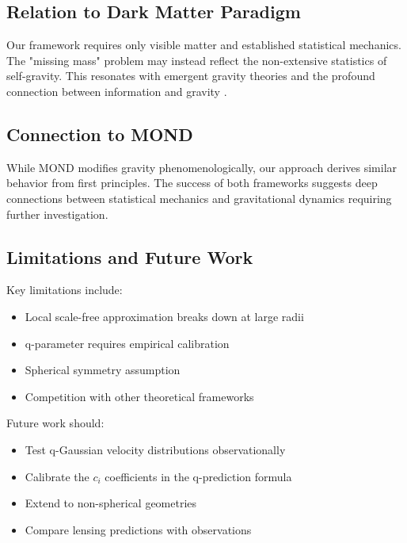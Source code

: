 \documentclass[12pt, a4paper]{article}
\theoremstyle{definition}
\theoremstyle{remark}
\begin{document}
\subsection{Relation to Dark Matter Paradigm}

Our framework requires only visible matter and established statistical mechanics. The "missing mass" problem may instead reflect the non-extensive statistics of self-gravity. This resonates with emergent gravity theories \cite{Verlinde2011, Jacobson1995, Padmanabhan2010} and the profound connection between information and gravity \cite{Bekenstein1973, Hawking1975, Susskind1995, Wheeler1990, Zurek2003}.

\subsection{Connection to MOND}

While MOND \cite{Milgrom1983, Famaey2012} modifies gravity phenomenologically, our approach derives similar behavior from first principles. The success of both frameworks suggests deep connections between statistical mechanics and gravitational dynamics requiring further investigation.

\subsection{Limitations and Future Work}

Key limitations include:
\begin{itemize}
\item Local scale-free approximation breaks down at large radii
\item q-parameter requires empirical calibration
\item Spherical symmetry assumption
\item Competition with other theoretical frameworks
\end{itemize}

Future work should:
\begin{itemize}
\item Test q-Gaussian velocity distributions observationally
\item Calibrate the $c_i$ coefficients in the q-prediction formula
\item Extend to non-spherical geometries
\item Compare lensing predictions with observations
\end{itemize}

\end{document}
